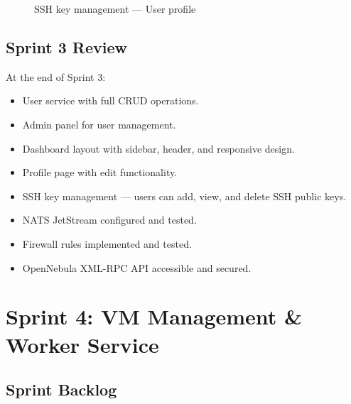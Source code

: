 \begin{figure}[H]
\centering
{}
\caption{SSH key management — User profile}
\label{fig:ssh-keys}
\end{figure}

\subsection{Sprint 3 Review}

At the end of Sprint 3:
\begin{itemize}
  \item User service with full CRUD operations.
  \item Admin panel for user management.
  \item Dashboard layout with sidebar, header, and responsive design.
  \item Profile page with edit functionality.
  \item SSH key management — users can add, view, and delete SSH public keys.
  \item NATS JetStream configured and tested.
  \item Firewall rules implemented and tested.
  \item OpenNebula XML-RPC API accessible and secured.
\end{itemize}


\section{Sprint 4: VM Management \& Worker Service}


\subsection{Sprint Backlog}

